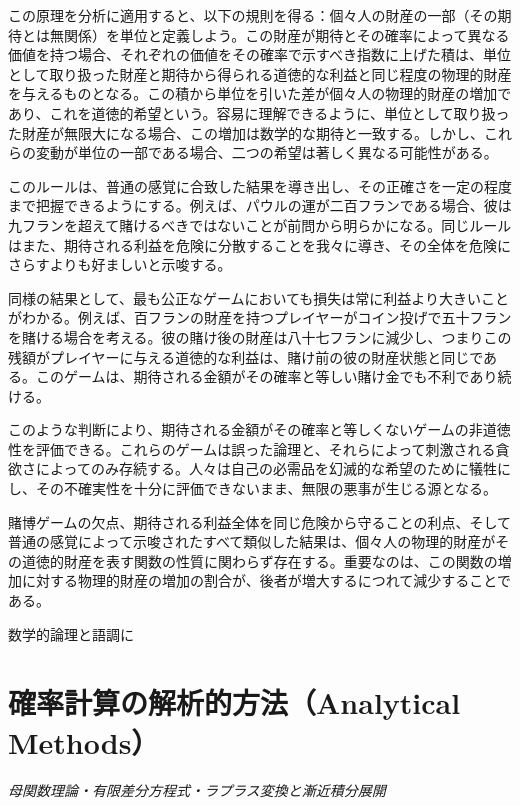 \documentclass[a4paper,11pt,openany]{ltjsbook}
\begin{document}
この原理を分析に適用すると、以下の規則を得る：個々人の財産の一部（その期待とは無関係）を単位と定義しよう。この財産が期待とその確率によって異なる価値を持つ場合、それぞれの価値をその確率で示すべき指数に上げた積は、単位として取り扱った財産と期待から得られる道徳的な利益と同じ程度の物理的財産を与えるものとなる。この積から単位を引いた差が個々人の物理的財産の増加であり、これを道徳的希望という。容易に理解できるように、単位として取り扱った財産が無限大になる場合、この増加は数学的な期待と一致する。しかし、これらの変動が単位の一部である場合、二つの希望は著しく異なる可能性がある。

このルールは、普通の感覚に合致した結果を導き出し、その正確さを一定の程度まで把握できるようにする。例えば、パウルの運が二百フランである場合、彼は九フランを超えて賭けるべきではないことが前問から明らかになる。同じルールはまた、期待される利益を危険に分散することを我々に導き、その全体を危険にさらすよりも好ましいと示唆する。

同様の結果として、最も公正なゲームにおいても損失は常に利益より大きいことがわかる。例えば、百フランの財産を持つプレイヤーがコイン投げで五十フランを賭ける場合を考える。彼の賭け後の財産は八十七フランに減少し、つまりこの残額がプレイヤーに与える道徳的な利益は、賭け前の彼の財産状態と同じである。このゲームは、期待される金額がその確率と等しい賭け金でも不利であり続ける。

このような判断により、期待される金額がその確率と等しくないゲームの非道徳性を評価できる。これらのゲームは誤った論理と、それらによって刺激される貪欲さによってのみ存続する。人々は自己の必需品を幻滅的な希望のために犠牲にし、その不確実性を十分に評価できないまま、無限の悪事が生じる源となる。

賭博ゲームの欠点、期待される利益全体を同じ危険から守ることの利点、そして普通の感覚によって示唆されたすべて類似した結果は、個々人の物理的財産がその道徳的財産を表す関数の性質に関わらず存在する。重要なのは、この関数の増加に対する物理的財産の増加の割合が、後者が増大するにつれて減少することである。

数学的論理と語調に

\newpage

\chapter{確率計算の解析的方法（Analytical Methods）}
\label{ch:v}

\begin{center}
\large\textit{母関数理論・有限差分方程式・ラプラス変換と漸近積分展開}
\end{center}
\vspace{4mm}
\end{document}
